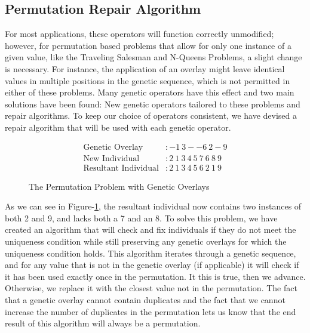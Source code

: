 \subsection*{Permutation Repair Algorithm}
For most applications, these operators will function correctly unmodified; however, for permutation based problems that allow for only one instance of a given value, like the Traveling Salesman and N-Queens Problems, a slight change is necessary. For instance, the application of an overlay might leave identical values in multiple positions in the genetic sequence, which is not permitted in either of these problems. Many genetic operators have this effect and two main solutions have been found: New genetic operators tailored to these problems and repair algorithms\cite{Larranaga99}. To keep our choice of operators consistent, we have devised a repair algorithm that will be used with each genetic operator.
\begin{figure}[h!]
\centering 
\begin{align*}
\text{Genetic Overlay} &:   -1~3--6~2-9				\\
\text{New Individual} &: 2~1~3~4~5~7~6~8~9			\\		
\text{Resultant Individual} &: 2~1~3~4~5~6~2~1~9
\end{align*}
\caption{The Permutation Problem with Genetic Overlays}
\label{PRA-Fig}
\end{figure}

As we can see in Figure-\ref{PRA-Fig}, the resultant individual now contains two instances of both 2 and 9, and lacks both a 7 and an 8. To solve this problem, we have created an algorithm that will check and fix individuals if they do not meet the uniqueness condition while still preserving any genetic overlays for which the uniqueness condition holds. This algorithm iterates through a genetic sequence, and for any value that is not in the genetic overlay (if applicable) it will check if it has been used exactly once in the permutation. It this is true, then we advance. Otherwise, we replace it with the closest value not in the permutation. The fact that a genetic overlay cannot contain duplicates and the fact that we cannot increase the number of duplicates in the permutation lets us know that the end result of this algorithm will always be a permutation. 